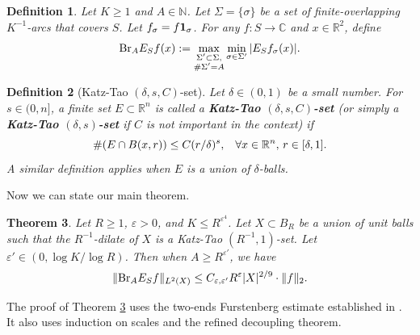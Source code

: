 \documentclass{amsart}
\numberwithin{equation}{section}
\newtheorem{theorem}{Theorem}[section]
\newtheorem{definition}[theorem]{Definition}
\newcommand{\de}{\delta}
\newcommand{\e}{\varepsilon}
\newcommand{\si}{\sigma}
\newcommand{\Si}{\Sigma}
\newcommand{\ZR}{\mathbb{R}}
\newcommand{\ZC}{\mathbb{C}}
\newcommand{\ZN}{\mathbb{N}}
\newcommand{\Id}{{\bf 1}}
\newcommand{\BR}{{\rm{Br}}}
\begin{document}
\begin{definition}
\label{def-broad-function-intro}
Let $K\geq 1$ and $A\in\ZN$.
Let $\Si=\{\si\}$ be a set of finite-overlapping $K^{-1}$-arcs that covers $S$. 
Let $f_\si=f\Id_\si$.
For any $f:S\to\ZC$ and  $x\in \ZR^2$, define 
\begin{equation}
    \BR_A E_Sf(x):=\max_{\substack{\Si'\subset\Si,\\ \#\Si'=A}}\min_{\si\in\Si'}|E_Sf_\si(x)|.
\end{equation}
\end{definition}



\begin{definition}[Katz-Tao $(\de,s,C)$-set]
Let $\delta\in(0,1)$ be a small number.
For $s\in(0,n]$, a finite set $E\subset \ZR^n$ is called a {\bf Katz-Tao $(\de,s,C)$-set} (or simply a {\bf Katz-Tao $(\de,s)$-set} if $C$ is not important in the context) if 
\begin{equation}
    \#(E\cap B(x,r))\leq C(r/\de)^s, \hspace{.3cm}\forall x \in\ZR^n, \,r\in[\de,1].
\end{equation}
A similar definition applies when $E$ is a union of $\de$-balls.
\end{definition}

\smallskip

Now we can state our main theorem.

\begin{theorem}
\label{main-thm-intro}
Let $R\geq 1$, $\e>0$, and $K\leq R^{\e^4}$.
Let $X\subset B_R$ be a union of unit balls such that the $R^{-1}$-dilate of $X$ is a Katz-Tao $(R^{-1},1)$-set.
Let $\e'\in(0,\log K/\log R)$.
Then when $A\geq R^{\e'}$, we have
\begin{equation}
\label{main-esti-intro}
    \|\BR_AE_Sf\|_{L^2(X)}\leq C_{\e,\e'} R^{\e}|X|^{2/9}\cdot\|f\|_2.
\end{equation}
\end{theorem}

The proof of Theorem \ref{main-thm-intro} uses the two-ends Furstenberg estimate established in \cite{Wang-Wu}.
It also uses induction on scales and the refined decoupling theorem.

\smallskip
\end{document}
